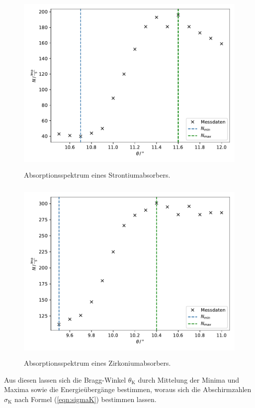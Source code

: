 \begin{figure}
    \centering
       \includegraphics[height=9cm]{daten/strontium.pdf}
       \caption{Absorptionsspektrum eines Strontiumabsorbers.}
       \label{fig:strontium}
\end{figure}

\begin{figure}
    \centering
       \includegraphics[height=9cm]{daten/zirkonium.pdf}
       \caption{Absorptionsspektrum eines Zirkoniumabsorbers.}
       \label{fig:zirkonium}
\end{figure}

\noindent
Aus diesen lassen sich die Bragg-Winkel $\theta_\text{K}$ durch Mittelung der Minima und Maxima sowie die Energieübergänge bestimmen,
woraus sich die Abschirmzahlen $\sigma_\text{K}$ nach Formel (\ref{eqn:sigmaK}) bestimmen lassen.

